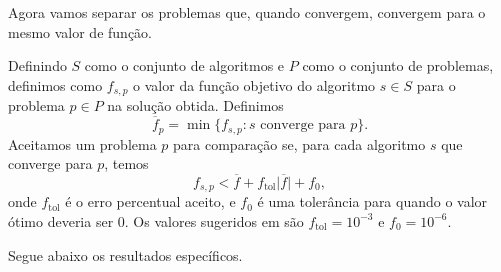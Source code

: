 \documentclass{article}
\newcommand{\ftol}{f_{\mbox{tol}}}
\begin{document}
Agora vamos separar os problemas que, quando convergem, convergem para o mesmo
valor de função.

Definindo $S$ como o conjunto de algoritmos e $P$ como o conjunto de problemas,
definimos como $f_{s,p}$ o valor da função objetivo do algoritmo $s \in S$ para
o problema $p \in P$ na solução obtida.
Definimos
$$ \overline{f}_{p} = \min\{f_{s,p} : s \mbox{ converge para } p\}. $$
Aceitamos um problema $p$ para comparação se, para cada algoritmo $s$ que
converge para $p$, temos
$$ f_{s,p} < \overline{f} + \ftol\vert\overline{f}\vert + f_0, $$
onde $\ftol$ é o erro percentual aceito, e $f_0$ é uma tolerância para quando o
valor ótimo deveria ser $0$.
Os valores sugeridos em \cite{bib:compare-optimal-values} são $\ftol=10^{-3}$ e
$f_0 = 10^{-6}$.

Segue abaixo os resultados específicos.





\end{document}
